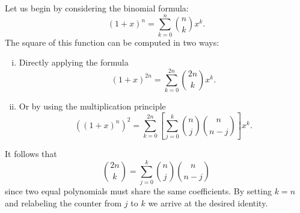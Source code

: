 \documentclass[12pt]{memoir}
\begin{document}
\begin{ptcbr}
    Let us begin by considering the binomial formula:
    $$(1+x)^n=\sum_{k=0}^n\binom{n}{k}x^k.$$
    The square of this function can be computed in two ways:
    \begin{enumerate}[i)]
        \itemsep=-0.4em
        \item Directly applying the formula 
        $$(1+x)^{2n}=\sum_{k=0}^{2n}\binom{2n}{k}x^k.$$
        \item Or by using the multiplication principle 
        $$\left((1+x)^n\right)^2=\sum_{k=0}^{2n}\left\lbrack\sum_{j=0}^k\binom{n}{j}\binom{n}{n-j}\right\rbrack x^k.$$
    \end{enumerate}
    It follows that 
    $$\binom{2n}{k}=\sum_{j=0}^k\binom{n}{j}\binom{n}{n-j}$$
    since two equal polynomials must share the same coefficients. By setting $k=n$ and relabeling the counter from $j$ to $k$ we arrive at the desired identity.
\end{ptcbr}
\end{document}
